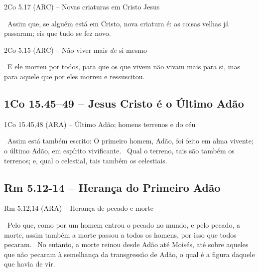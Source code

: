 \documentclass[12pt,aspectratio=169]{beamer}
\newcommand{\ver}[1]{%
    \raisebox{0.50ex}{%
        \scalebox{1.1}{%
            \pmb{\textbf{\textcolor{BSpbg}{#1}}}%
        }%
    }%
}
\newcommand{\QUOTE}[1]{%
    \par\noindent\hspace*{0.05\linewidth}%
    \begin{minipage}{0.9\linewidth}%
        \linespread{1.35}\large{#1}%
    \end{minipage}%
}
\newcommand{\RED}[1]{{\textcolor{TXred}{#1}}}
\newcommand{\YEL}[1]{{\textcolor{TXyel}{#1}}}
\newcommand{\GRE}[1]{{\textcolor{TXgre}{#1}}}
\newcommand{\MAG}[1]{{\textcolor{TXmag}{#1}}}
\begin{document}
    \begin{frame}{2Co 5.17 (ARC) -- \YEL{Novas criaturas} \MAG{em Cristo Jesus}}
        \QUOTE{%
            \ver{17}~Assim que, se alguém \MAG{está em Cristo}, \GRE{nova criatura} é: as coisas
            velhas já passaram; eis que tudo se fez novo.
        }
    \end{frame}

    \begin{frame}{2Co 5.15 (ARC) -- Não viver mais \YEL{\emph{de} si mesmo}}
        \QUOTE{%
            \ver{15}~E ele morreu por todos, para que os que vivem \YEL{não vivam mais para si},
            mas para aquele que por eles morreu e ressuscitou.
        }
    \end{frame}

    \subsection{1Co 15.45--49 -- Jesus Cristo é o Último Adão}

    \begin{frame}{1Co 15.45,48 (ARA) -- \YEL{Último Adão}; homens \RED{terrenos} e \GRE{do céu}}
        \QUOTE{%
            \ver{45}~Assim está também escrito: O \RED{primeiro homem, Adão}, foi feito em alma
            vivente; o \GRE{último Adão}, em espírito vivificante.
            \ver{48}~Qual o \RED{terreno}, \YEL{tais são também} os terrenos; e, qual o
            \GRE{celestial}, \YEL{tais também} os celestiais.
        }
    \end{frame}

    \subsection{Rm 5.12-14 -- Herança do Primeiro Adão}

    \begin{frame}{Rm 5.12,14 (ARA) -- Herança de \RED{pecado} e \RED{morte}}
        \QUOTE{%
            \ver{12}~Pelo que, como \YEL{por um homem} entrou o \RED{pecado} no mundo, e pelo
            pecado, a \RED{morte}, assim também a morte passou a todos os homens, por isso que
            todos pecaram.
            \ver{14}~No entanto, a morte reinou desde Adão até Moisés, até sobre aqueles que não
            pecaram à semelhança da transgressão de \YEL{Adão}, o qual é a \YEL{figura daquele
            que havia de vir}.
        }
    \end{frame}
\end{document}
